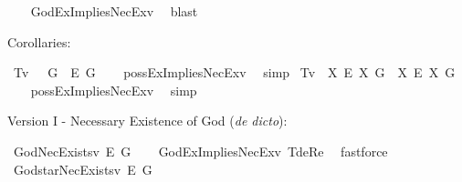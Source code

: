 \begin{isabellebody}
%
\ \ %
%
\isamarkupfalse%
\ GodExImpliesNecEx{\isacharunderscore}v{}\ \isamarkupfalse%
\ blast%
%
%
%
\begin{isamarkuptext}%
Corollaries:%
\end{isamarkuptext}\isamarkuptrue%
\isamarkupfalse%
\ T{}{\isacharunderscore}v{}{\isacharcolon}\ \ {\isachardoublequoteopen}{\isasymlfloor}\isactrlbold {\isasymdiamond}\isactrlbold {\isasymexists}\ \isactrlbold {\isasymdown}G{\isasymrfloor}\ {\isasymlongrightarrow}\ {\isasymlfloor}\isactrlbold {\isasymbox}\isactrlbold {\isasymexists}\isactrlsup E\ \isactrlbold {\isasymdown}G{\isasymrfloor}{\isachardoublequoteclose}\isanewline
%
\ \ %
%
\isamarkupfalse%
\ possExImpliesNecEx{\isacharunderscore}v{}\ \isamarkupfalse%
\ simp%
%
\isanewline
%
\isamarkupfalse%
\ T{}{\isacharunderscore}v{}{\isacharcolon}\ \ {\isachardoublequoteopen}{\isasymlfloor}{\isacharparenleft}{\isasymlambda}X{\isachardot}\ \isactrlbold {\isasymdiamond}\isactrlbold {\isasymexists}\isactrlsup E\ X{\isacharparenright}\ \isactrlbold {\isasymdown}G{\isasymrfloor}\ {\isasymlongrightarrow}\ {\isasymlfloor}{\isacharparenleft}{\isasymlambda}X{\isachardot}\ \isactrlbold {\isasymbox}\isactrlbold {\isasymexists}\isactrlsup E\ X{\isacharparenright}\ \isactrlbold {\isasymdown}G{\isasymrfloor}{\isachardoublequoteclose}\isanewline
%
\ \ %
%
\isamarkupfalse%
\ possExImpliesNecEx{\isacharunderscore}v{}\ \isamarkupfalse%
\ simp%
%
%
%
\isamarkuptrue%
%
\begin{isamarkuptext}%
Version I - Necessary Existence of God (\emph{de dicto}):%
\end{isamarkuptext}\isamarkuptrue%
\isamarkupfalse%
\ GodNecExists{\isacharunderscore}v{}{\isacharcolon}\ {\isachardoublequoteopen}{\isasymlfloor}\isactrlbold {\isasymbox}\isactrlbold {\isasymexists}\isactrlsup E\ \isactrlbold {\isasymdown}G{\isasymrfloor}{\isachardoublequoteclose}\isanewline
%
\ \ %
%
\isamarkupfalse%
\ GodExImpliesNecEx{\isacharunderscore}v{}\ T{}{\isacharunderscore}deRe\ \isamarkupfalse%
\ fastforce\ %
%
%
\isanewline
%
\isamarkupfalse%
\ God{\isacharunderscore}starNecExists{\isacharunderscore}v{}{\isacharcolon}\ {\isachardoublequoteopen}{\isasymlfloor}\isactrlbold {\isasymbox}\isactrlbold {\isasymexists}\isactrlsup E\ \isactrlbold {\isasymdown}G{\isacharasterisk}{\isasymrfloor}{\isachardoublequoteclose}\isanewline

\end{isabellebody}
